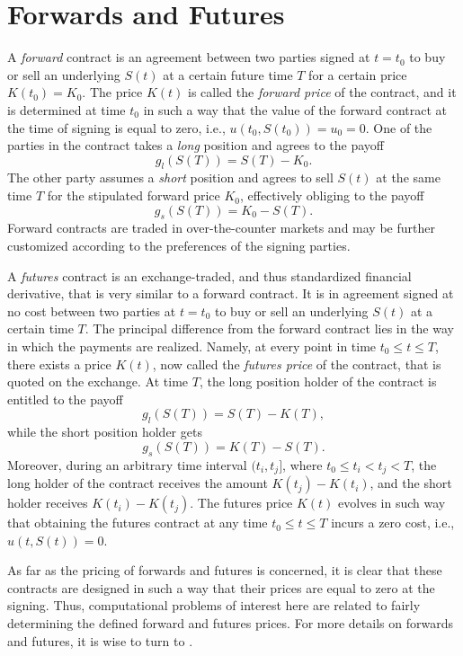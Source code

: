 \documentclass{UUThesisTemplate}
\begin{document}
\section{Forwards and Futures}
\label{sec:futures}
\par A \emph{forward} contract is an agreement between two parties signed at $t=t_0$ to buy or sell an underlying $S(t)$ at a certain future time $T$ for a certain price $K(t_0)=K_0$. The price $K(t)$ is called the \emph{forward price} of the contract, and it is determined at time $t_0$ in such a way that the value of the forward contract at the time of signing is equal to zero, i.e., $u(t_0,S(t_0))=u_0=0$. One of the parties in the contract takes a \emph{long} position and agrees to the payoff 
$$g_l(S(T))=S(T)-K_0.$$
The other party assumes a \emph{short} position and agrees to sell $S(t)$ at the same time $T$ for the stipulated forward price $K_0$, effectively obliging to the payoff 
$$g_s(S(T))=K_0-S(T).$$
Forward contracts are traded in over-the-counter markets and may be further customized according to the preferences of the signing parties.
\par A \emph{futures} contract is an exchange-traded, and thus standardized financial derivative, that is very similar to a forward contract. It is in agreement signed at no cost between two parties at $t=t_0$ to buy or sell an underlying $S(t)$ at a certain time $T$. The principal difference from the forward contract lies in the way in which the payments are realized. Namely, at every point in time $t_0 \leq t \leq T$, there exists a price $K(t)$, now called the \emph{futures price} of the contract, that is quoted on the exchange. At time $T$, the long position holder of the contract is entitled to the payoff 
$$g_l(S(T))=S(T)-K(T),$$
while the short position holder gets 
$$g_s(S(T))=K(T)-S(T).$$
Moreover, during an arbitrary time interval $(t_i,t_j]$, where $t_0 \leq t_i < t_j < T$, the long holder of the contract receives the amount $K(t_j)-K(t_i)$, and the short holder receives $K(t_i)-K(t_j)$. The futures price $K(t)$ evolves in such way that obtaining the futures contract at any time $t_0 \leq t \leq T$ incurs a zero cost, i.e., $u(t,S(t))=0$. 
\par As far as the pricing of forwards and futures is concerned, it is clear that these contracts are designed in such a way that their prices are equal to zero at the signing. Thus, computational problems of interest here are related to fairly determining the defined forward and futures prices. For more details on forwards and futures, it is wise to turn to \cite{hull2017options,duffie1989futures}.  
%
\end{document}
